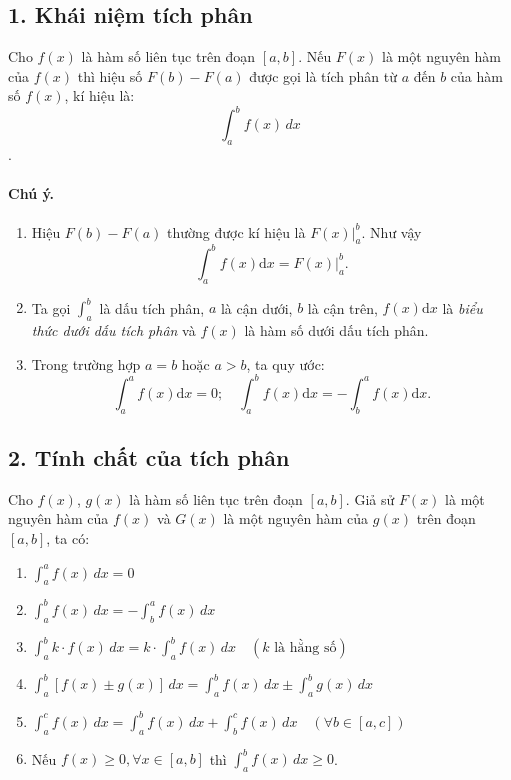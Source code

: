 \documentclass{article}
\begin{document}
\bigskip


\subsection*{1. Khái niệm tích phân}

\hspace{1cm}Cho $f(x)$ là hàm số liên tục trên đoạn $[a, b]$. Nếu $F(x)$ là một nguyên hàm của $f(x)$ thì hiệu số $F(b) - F(a)$ được gọi là tích phân từ $a$ đến $b$ của hàm số $f(x)$, kí hiệu là:
\[\int_{a}^{b} f(x) \, dx\].

\paragraph{Chú ý.}
\begin{enumerate}
    \item[a)] Hiệu $F(b) - F(a)$ thường được kí hiệu là $\left. F(x) \right|_a^b$.
    Như vậy
    \[\int_a^b f(x)\mathrm{d}x = \left. F(x) \right|_a^b.\]

    \item[b)] Ta gọi $\displaystyle\int_a^b$ là dấu tích phân, $a$ là cận dưới, $b$ là cận trên, $f(x)\mathrm{d}x$ là \textit{biểu thức dưới dấu tích phân} và $f(x)$ là hàm số dưới dấu tích phân.

    \item[c)] Trong trường hợp $a = b$ hoặc $a > b$, ta quy ước:
    \[\int_a^a f(x)\mathrm{d}x = 0; \quad \int_a^b f(x)\mathrm{d}x = -\int_b^a f(x)\mathrm{d}x.\]
\end{enumerate}

\bigskip

\subsection*{2. Tính chất của tích phân}
\hspace{1cm}Cho $f(x)$, $g(x)$ là hàm số liên tục trên đoạn $[a, b]$. Giả sử $F(x)$ là một nguyên hàm của $f(x)$ và $G(x)$ là một nguyên hàm của $g(x)$ trên đoạn $[a, b]$, ta có:
\begin{enumerate}
    \item $\int_{a}^{a} f(x) \, dx = 0$
    \item $\int_{a}^{b} f(x) \, dx = -\int_{b}^{a} f(x) \, dx$
    \item $\int_{a}^{b} k \cdot f(x) \, dx = k \cdot \int_{a}^{b} f(x) \, dx \quad (k \text{ là hằng số})$
    \item $\int_{a}^{b} [f(x) \pm g(x)] \, dx = \int_{a}^{b} f(x) \, dx \pm \int_{a}^{b} g(x) \, dx$
    \item $\int_{a}^{c} f(x) \, dx = \int_{a}^{b} f(x) \, dx + \int_{b}^{c} f(x) \, dx \quad (\forall b \in [a, c])$
    \item Nếu $f(x) \ge 0, \forall x \in [a, b]$ thì $\int_{a}^{b} f(x) \, dx \ge 0$.
\end{enumerate}
\end{document}
